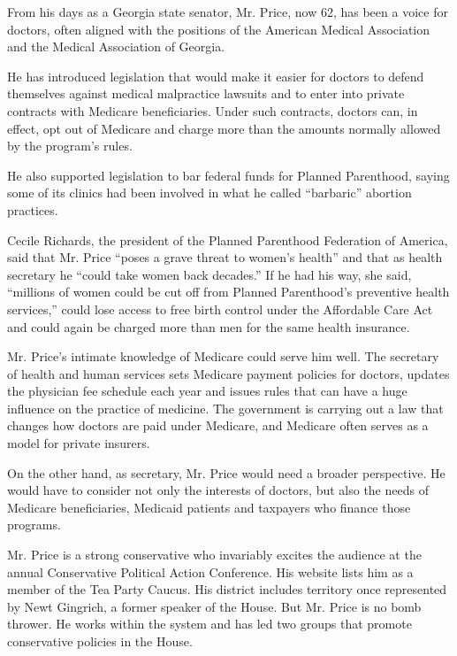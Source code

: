From his days as a Georgia state senator, Mr. Price, now 62, has been a
voice for doctors, often aligned with the positions of the American
Medical Association and the Medical Association of Georgia.

He has introduced legislation that would make it easier for doctors to
defend themselves against medical malpractice lawsuits and to enter into
private contracts with Medicare beneficiaries. Under such contracts,
doctors can, in effect, opt out of Medicare and charge more than the
amounts normally allowed by the program's rules.

He also supported legislation to bar federal funds for Planned
Parenthood, saying some of its clinics had been involved in what he
called ``barbaric'' abortion practices.

Cecile Richards, the president of the Planned Parenthood Federation of
America, said that Mr. Price ``poses a grave threat to women's health''
and that as health secretary he ``could take women back decades.'' If he
had his way, she said, ``millions of women could be cut off from Planned
Parenthood's preventive health services,'' could lose access to free
birth control under the Affordable Care Act and could again be charged
more than men for the same health insurance.

Mr. Price's intimate knowledge of Medicare could serve him well. The
secretary of health and human services sets Medicare payment policies
for doctors, updates the physician fee schedule each year and issues
rules that can have a huge influence on the practice of medicine. The
government is carrying out a law that changes how doctors are paid under
Medicare, and Medicare often serves as a model for private insurers.

On the other hand, as secretary, Mr. Price would need a broader
perspective. He would have to consider not only the interests of
doctors, but also the needs of Medicare beneficiaries, Medicaid patients
and taxpayers who finance those programs.

Mr. Price is a strong conservative who invariably excites the audience
at the annual Conservative Political Action Conference. His website
lists him as a member of the Tea Party Caucus. His district includes
territory once represented by Newt Gingrich, a former speaker of the
House. But Mr. Price is no bomb thrower. He works within the system and
has led two groups that promote conservative policies in the House.

\href{https://www.nytimes.com/interactive/2016/11/11/us/politics/what-trump-wants-to-change.html}{}

